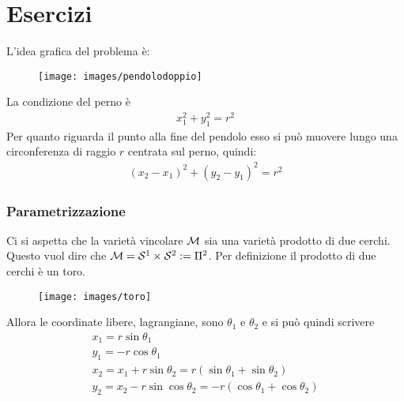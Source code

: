 \documentclass[Main.tex]{subfiles}
\begin{document}
\section{Esercizi} \toc
\begin{tema}
L'idea grafica del problema è:

\begin{figure}[H]
    \centering
 \texttt{[image: images/pendolodoppio]}
\end{figure}
La condizione del perno è
\begin{gather}
	x_1^2 + y_1^2= r ^2
\end{gather}
Per quanto riguarda il punto alla fine del pendolo esso si può muovere lungo una circonferenza di raggio $r$ centrata sul perno, quindi:
\begin{gather}
	(x_2-x_1)^2 + (y_2-y_1)^2 = r^2
\end{gather}
\subsubsection*{Parametrizzazione}
Ci si aspetta che la varietà vincolare $\mathcal{M}$ sia una varietà prodotto di due cerchi. Questo vuol dire che $\mathcal{M} = \mathcal{S}^1 \times \mathcal{S}^2 := \Pi^2$. Per definizione il prodotto di due cerchi è un toro. 

\begin{figure}[H]
    \centering
  \texttt{[image: images/toro]}
\end{figure}

Allora le coordinate libere, lagrangiane, sono $\theta_1$ e $\theta_2$ e si può quindi scrivere
\begin{gather}
	x_1 = r \sin \theta_1 \\
	y_1 = - r \cos \theta_1\\
	x_2 = x_1 + r \sin \theta_2 = r (\sin \theta_1 + \sin \theta_2)\\
	y_2 = x_2 - r \sin \cos \theta_2 = -r ( \cos \theta_1 + \cos \theta_2)
\end{gather}

\end{tema}
\end{document}
